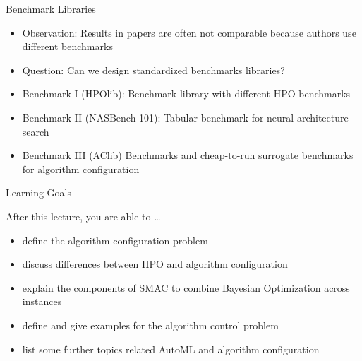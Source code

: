 \begin{frame}[c]{Benchmark Libraries}

\begin{itemize}
	\item \alert{Observation}: Results in papers are often not comparable because authors use different benchmarks
	\smallskip
	\pause
	\item \alert{Question}: Can we design standardized benchmarks libraries?
	\smallskip
	\pause
	\item \alert{Benchmark I (HPOlib)}: Benchmark library with different HPO benchmarks
	\smallskip
	\pause
	\item \alert{Benchmark II (NASBench 101)}: Tabular benchmark for neural architecture search
	\smallskip
	\pause
	\item  \alert{Benchmark III (AClib)} Benchmarks and cheap-to-run surrogate benchmarks for algorithm configuration
\end{itemize}

\end{frame}

\begin{frame}[c]{Learning Goals}

After this lecture, you are able to \ldots

\begin{itemize}
	\item define the \alert{algorithm configuration problem}
	\item discuss \alert{differences} between HPO and algorithm configuration
	\item explain the \alert{components of SMAC} to combine Bayesian Optimization across instances
	\item define and give examples for the \alert{algorithm control problem}
	\item list some \alert{further topics} related AutoML and algorithm configuration
\end{itemize}

\end{frame}

